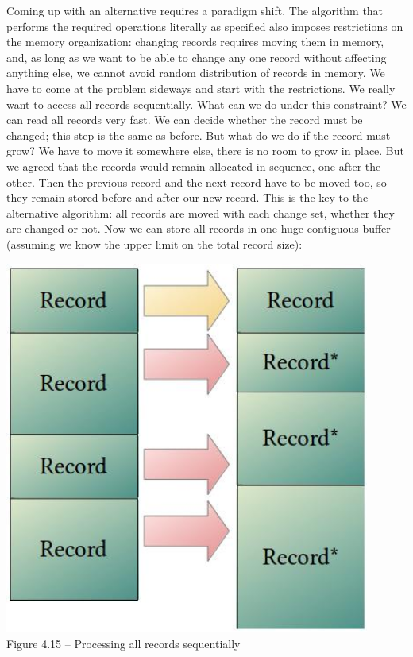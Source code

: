Coming up with an alternative requires a paradigm shift. The algorithm that performs the required operations literally as specified also imposes restrictions on the memory organization: changing records requires moving them in memory, and, as long as we want to be able to change any one record without affecting anything else, we cannot avoid random distribution of records in memory. We have to come at the problem sideways and start with the restrictions. We really want to access all records sequentially. What can we do under this constraint? We can read all records very fast. We can decide whether the record must be changed; this step is the same as before. But what do we do if the record must grow? We have to move it somewhere else, there is no room to grow in place. But we agreed that the records would remain allocated in sequence, one after the other. Then the previous record and the next record have to be moved too, so they remain stored before and after our new record. This is the key to the alternative algorithm: all records are moved with each change set, whether they are changed or not. Now we can store all records in one huge contiguous buffer (assuming we know the upper limit on the total record size):

\begin{center}
\includegraphics[width=0.9\textwidth]{content/1/chapter4/images/15.jpg}\\
Figure 4.15 – Processing all records sequentially
\end{center}

